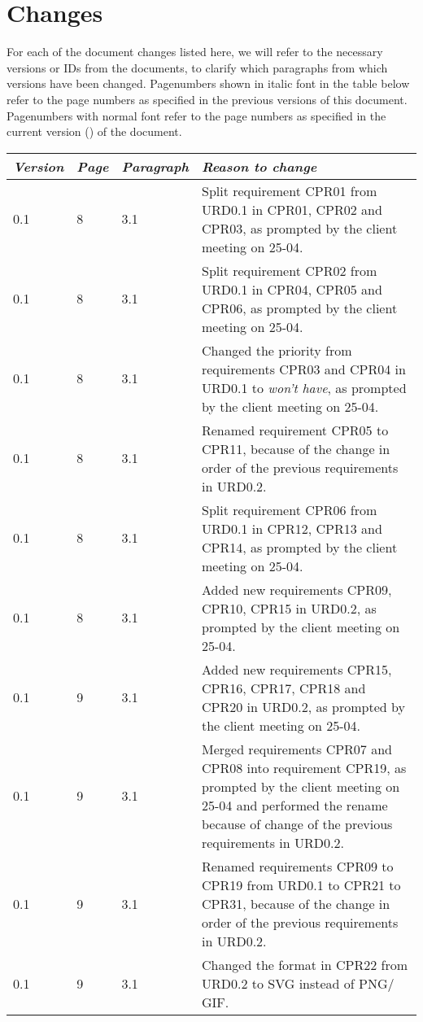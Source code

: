 \section*{Changes}
For each of the document changes listed here, we will refer to the necessary versions or IDs from the documents, to clarify which paragraphs from which versions have been changed. Pagenumbers shown in italic font in the table below refer to the page numbers as specified in the previous versions of this document. Pagenumbers with normal font refer to the page numbers as specified in the current version (\Version) of the document.\\

\begin{tabular}[!]{|l|l|l|p{11cm}|}
    \hline
    \emph{Version} & \emph{Page} &   \emph{Paragraph}    &   \emph{Reason to change}\\
    \hline
    0.1 & 8 & 3.1 & Split requirement CPR01 from URD0.1 in CPR01, CPR02 and CPR03, as prompted by the client meeting on 25-04. \\
     0.1 & 8 & 3.1 & Split requirement CPR02 from URD0.1 in CPR04, CPR05 and CPR06, as prompted by the client meeting on 25-04. \\
     0.1 & 8 & 3.1 & Changed the priority from requirements CPR03 and CPR04 in URD0.1 to \emph{won't have}, as prompted by the client meeting on 25-04. \\
     0.1 & 8 & 3.1 & Renamed requirement CPR05 to CPR11, because of the change in order of the previous requirements in URD0.2. \\
     0.1 & 8 & 3.1 & Split requirement CPR06 from URD0.1 in CPR12, CPR13 and CPR14, as prompted by the client meeting on 25-04. \\
     0.1 & 8 & 3.1 & Added new requirements CPR09, CPR10, CPR15 in URD0.2, as prompted by the client meeting on 25-04.  \\
     0.1 & 9 & 3.1 & Added new requirements CPR15, CPR16, CPR17, CPR18 and CPR20 in URD0.2, as prompted by the client meeting on 25-04.\\
     0.1 & 9 & 3.1 & Merged requirements CPR07 and CPR08 into requirement CPR19, as prompted by the client meeting on 25-04 and performed the rename because of change of the previous requirements in URD0.2. \\
    0.1 & 9 & 3.1 & Renamed requirements CPR09 to CPR19 from URD0.1 to CPR21 to CPR31, because of the change in order of the previous requirements in URD0.2. \\
   0.1 & 9 & 3.1 & Changed the format in CPR22 from URD0.2 to SVG instead of PNG$/$GIF. \\

\end{tabular}
